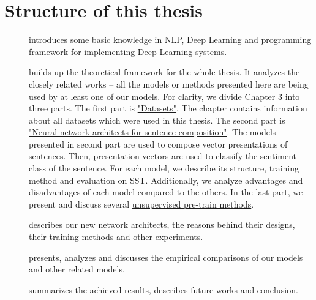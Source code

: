 \section{Structure of this thesis}
\begin{description}
\item [] introduces some basic knowledge in NLP, Deep Learning and programming framework for implementing Deep Learning systems.
\item [] builds up the theoretical framework for the whole thesis.
It analyzes the closely related works -- all the models or methods presented here are being used by at least one of our models.
For clarity, we divide Chapter 3 into three parts.
The first part is \hyperref[sec:dataset]{"Datasets"}.
The chapter contains information about all datasets which were used in this thesis.
The second part is \hyperref[sec:composer]{"Neural network architects for sentence composition"}.
The models presented in second part are used to compose vector presentations of sentences.
Then, presentation vectors are used to classify the sentiment class of the sentence.
For each model, we describe its structure, training method and evaluation on SST.
Additionally, we analyze advantages and disadvantages of each model compared to the others.
In the last part, we present and discuss several \hyperref[sec:unsupervised-pretrain]{unsupervised pre-train methods}.
\item [] describes our new network architects, the reasons behind their designs, their training methods and other experiments.
\item [] presents, analyzes and discusses the empirical comparisons of our models and other related models.
\item [] summarizes the achieved results, describes future works and conclusion.
\end{description}
